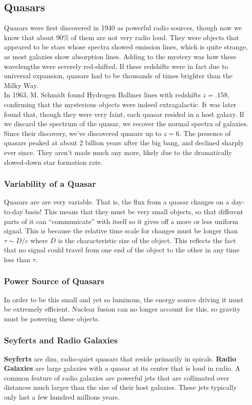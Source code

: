 \documentclass{article}
\begin{document}
	\subsection{Quasars}
	Quasars were first discovered in 1940 as powerful radio sources, though now we know that about 90\% of them are not very radio loud. They were objects that appeared to be stars whose spectra showed emission lines, which is quite strange, as most galaxies show absorption lines. Adding to the mystery was how these wavelengths were severely red-shifted. If these redshifts were in fact due to universal expansion, quasars had to be thousands of times brighter than the Milky Way.\\
	
	\noindent In 1963, M. Schmidt found Hydrogen Ballmer lines with redshifts $z=.158$, confirming that the mysterious objects were indeed extragalactic. It was later found that, though they were very faint, each quasar resided in a host galaxy. If we discard the spectrum of the quasar, we recover the normal spectra of galaxies.\\
	
	\noindent Since their discovery, we've discovered quasars up to $z=6$. The presence of quasars peaked at about 2 billion years after the big bang, and declined sharply ever since. They aren't made much any more, likely due to the dramatically slowed-down star formation rate.
	
	\subsubsection{Variability of a Quasar} Quasars are are very variable. That is, the flux from a quasar changes on a day-to-day basis! This means that they must be very small objects, so that different parts of it can ``communicate'' with itself so it gives off a more or less uniform signal. This is because the relative time scale for changes must be longer than $\tau\sim D/c$ where $D$ is the characteristic size of the object. This reflects the fact that no signal could travel from one end of the object to the other in any time less than $\tau$.
	\subsubsection{Power Source of Quasars}
	In order to be this small and yet so luminous, the energy source driving it must be extremely efficient. Nuclear fusion can no longer account for this, so gravity must be powering these objects.
	\subsubsection{Seyferts and Radio Galaxies}
	\textbf{Seyferts} are dim, radio-quiet quasars that reside primarily in spirals. \textbf{Radio Galaxies} are large galaxies with a quasar at its center that is loud in radio. A common feature of radio galaxies are powerful jets that are collimated over distances much larger than the size of their host galaxies. These jets typically only last a few hundred millions years.
\end{document}

